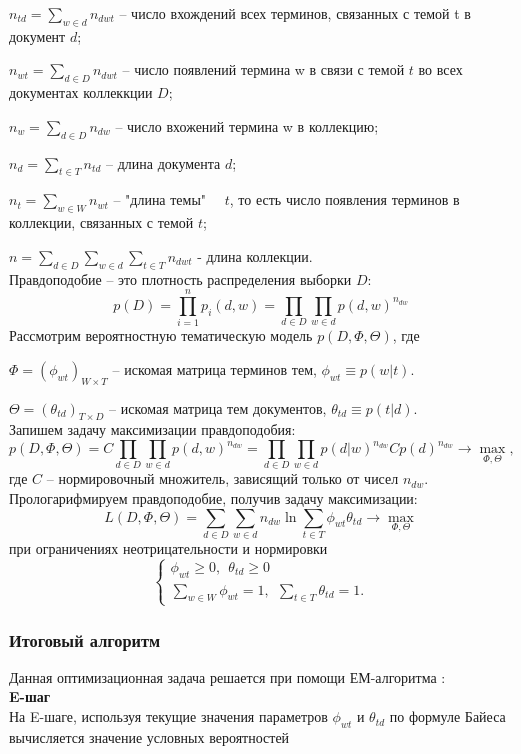 \documentclass[12pt]{article}
\renewcommand{\geq}{\geqslant}
\begin{document}
$n_{td} = \sum_{w \in d} n_{dwt}$ -- число вхождений всех терминов, связанных с темой t в документ $d$;

$n_{wt} = \sum_{d \in D} n_{dwt}$ -- число появлений термина w в связи с темой $t$ во всех документах коллеккции $D$;

$n_{w} = \sum_{d \in D} n_{dw}$ -- число вхожений термина w в коллекцию;

$n_{d} = \sum_{t \in T} n_{td}$ -- длина документа $d$;

$n_{t} = \sum_{w \in W} n_{wt}$ -- "длина темы" \ \ $t$, то есть число появления терминов в коллекции, связанных с темой $t$;

$n = \sum_{d \in D}\sum_{w \in d}\sum_{t \in T} n_{dwt}$ - длина коллекции.
\ \\
Правдоподобие --  это плотность распределения выборки $D$:
\[
p(D)=\prod^n_{i=1}p_i(d,w)=\prod_{d \in D}\prod_{w \in d}p(d,w)^{n_{dw}}
\]
Рассмотрим вероятностную тематическую модель $p(D,\Phi,\Theta)$, где 

$\Phi=(\phi_{wt})_{W \times T}$ -- искомая матрица терминов тем, $\phi_{wt} \equiv p(w|t)$.

$\Theta=(\theta_{td})_{T \times D}$ -- искомая матрица тем документов, $\theta_{td}\equiv p(t|d)$.
\ \\
Запишем задачу максимизации правдоподобия:
\[
p(D,\Phi,\Theta)=C\prod_{d \in D}\prod_{w \in d}p(d,w)^{n_{dw}}=\prod_{d \in D}\prod_{w \in d}p(d|w)^{n_{dw}}Cp(d)^{n_{dw}} \to \max_{\Phi,\Theta},
\]
где $C$ -- нормировочный множитель, зависящий только от чисел $n_{dw}$. Прологарифмируем правдоподобие, получив задачу максимизации:
\[
L(D,\Phi,\Theta)=\sum_{d \in D}\sum_{w \in d}n_{dw}\ln\sum_{t \in T}\phi_{wt}\theta_{td} \to \max_{\Phi,\Theta}
\]
при ограничениях неотрицательности и нормировки
\[
\left\{
	\begin{aligned}
		\phi_{wt} \geq 0,~~\theta_{td} \geq 0\\
		\sum_{w \in W} \phi_{wt} = 1,~~\sum_{t \in T} \theta_{td}  = 1.
	\end{aligned}
\right.
\]
\subsubsection{Итоговый алгоритм}
Данная оптимизационная задача решается при помощи ЕМ-алгоритма \cite{plsadef2}:\\
\textbf{E-шаг}\\
На E-шаге, используя текущие значения параметров $\phi_{wt}$ и $\theta_{td}$ по формуле Байеса вычисляется значение условных вероятностей 
\end{document}
